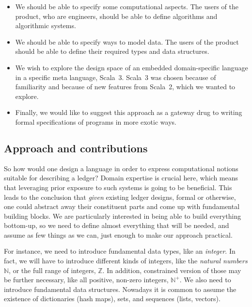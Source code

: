 \documentclass[11pt]{article}
\begin{document}
\begin{itemize}
  \item We should be able to specify some computational aspects. The users of 
  the product, who are engineers, should be able to define algorithms and 
  algorithmic systems.

  \item We should be able to specify ways to model data. The users of the 
  product should be able to define their required types and data structures.
  
  \item We wish to explore the design space of an embedded domain-specific 
  language in a specific meta language, Scala~3. Scala~3 was chosen because 
  of familiarity and because of new features from Scala~2, which we wanted to 
  explore.
  
  \item Finally, we would like to suggest this approach as a gateway drug to 
  writing formal specifications of programs in more exotic ways.
\end{itemize}


\subsection{Approach and contributions}
\label{sec:approach}

So how would one design a language in order to express computational notions 
suitable for describing a ledger? Domain expertise is crucial here, which 
means that leveraging prior exposure to such systems is going to be 
beneficial. This leads to the conclusion that \textit{given} existing ledger 
designs, formal or otherwise, one could abstract away their constituent parts 
and come up with fundamental building blocks. We are particularly interested 
in being able to build everything bottom-up, so we need to define almost 
everything that will be needed, and assume as few things as we can, just 
enough to make our approach practical.

For instance, we need to introduce fundamental data types, like an 
\textit{integer}. In fact, we will have to introduce different kinds of 
integers, like the \textit{natural numbers} $\mathbb{N}$, or the full range 
of integers, $\mathbb{Z}$. In addition, constrained version of those may be 
further necessary, like all positive, non-zero integers, $\mathbb{N}^+$. We 
also need to introduce fundamental data structures. Nowadays it is common to 
assume the existence of dictionaries (hash maps), sets, and sequences (lists, 
vectors).
\end{document}
